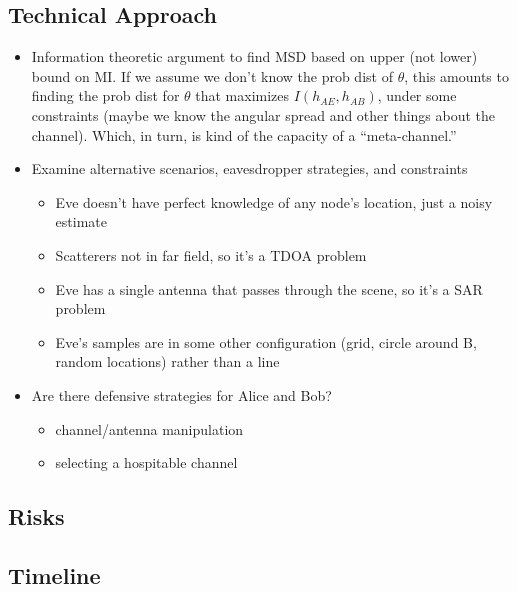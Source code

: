 \documentclass[12pt, titlepage]{article}
\begin{document}
\subsection*{Technical Approach}
\begin{itemize}
\item Information theoretic argument to find MSD based on upper (not lower) bound on MI.  If we assume we don't know the prob dist of $\theta$, this amounts to finding the prob dist for $\theta$ that maximizes $I(h_{AE}, h_{AB})$, under some constraints (maybe we know the angular spread and other things about the channel).  Which, in turn, is kind of the capacity of a ``meta-channel.'' 
\item Examine alternative scenarios, eavesdropper strategies, and constraints
\begin{itemize}
\item Eve doesn't have perfect knowledge of any node's location, just a noisy estimate
\item Scatterers not in far field, so it's a TDOA problem
\item Eve has a single antenna that passes through the scene, so it's a SAR problem
\item Eve's samples are in some other configuration (grid, circle around B, random locations) rather than a line
\end{itemize}
\item Are there defensive strategies for Alice and Bob? 
\begin{itemize}
	\item channel/antenna manipulation
	\item selecting a hospitable channel
\end{itemize}
\end{itemize}

\subsection*{Risks}
\subsection*{Timeline}
\end{document}
